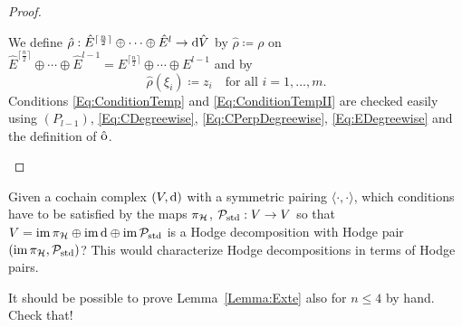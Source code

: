 \documentclass[\MainFolder/Text.tex]{subfiles}
\begin{document}
\begin{proof}
\begin{description}[leftmargin=0pt,font=\normalfont\itshape]
\item[Property $(P_l)$:] We define $\hat{\rho}: \hat{E}^{\lceil \frac{n}{2}\rceil}\oplus\dotsb\oplus\hat{E}^l \rightarrow \mathrm{d}\hat{V}$ by $\hat{\rho} \coloneqq \rho$ on $\hat{E}^{\lceil \frac{n}{2}\rceil}\oplus\dotsb\oplus\hat{E}^{l-1}=E^{\lceil \frac{n}{2}\rceil}\oplus\dotsb\oplus E^{l-1}$ and by
\[
\hat{\rho}(\xi_i) \coloneqq z_i\quad\text{for all }i=1, \dotsc, m.
\]
Conditions \eqref{Eq:ConditionTemp} and \eqref{Eq:ConditionTempII} are checked easily using $(P_{l-1})$, \eqref{Eq:CDegreewise}, \eqref{Eq:CPerpDegreewise}, \eqref{Eq:EDegreewise} and the definition of $\hat{\mathrm{o}}$.\qedhere
%
%
%
%
%
%
\end{description}
\end{proof}

\begin{Questions}\label{Q:QuestOnPoinc}
\begin{RemarkList}
\item Given a cochain complex $(V,\mathrm{d})$ with a symmetric pairing $\langle\cdot,\cdot\rangle$, which conditions have to be satisfied by the maps $\pi_{\mathcal{H}}$, $\mathcal{P}_{\mathrm{std}}: V\rightarrow V$ so that $V=\operatorname{im} \pi_{\mathcal{H}} \oplus \operatorname{im} \mathrm{d} \oplus \operatorname{im} \mathcal{P}_{\mathrm{std}}$ is a Hodge decomposition with Hodge pair $(\operatorname{im} \pi_{\mathcal{H}}, \mathcal{P}_{\mathrm{std}})$? This would characterize Hodge decompositions in terms of Hodge pairs.
\item It should be possible to prove Lemma~\ref{Lemma:Exte} also for $n\le 4$ by hand. Check that! 
\qedhere
\end{RemarkList}
\end{Questions}
\end{document}

